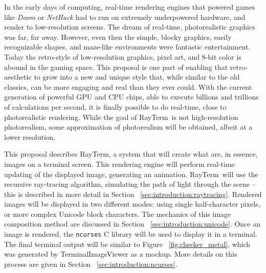 \documentclass[11pt]{article}
\newcommand{\name}{{\sc RayTerm}}
\begin{document}

In the early days of computing, real-time rendering engines that powered games like {\it Doom} or {\it NetHack} had to run on extremely underpowered hardware, and render to low-resolution screens.
The dream of real-time, photorealistic graphics was far, far away.
However, even then the simple, blocky graphics, easily recognizable shapes, and maze-like environments were fantastic entertainment.
Today the retro-style of low-resolution graphics, pixel art, and 8-bit color is abound in the gaming space.
This proposal is one part of enabling that retro-aesthetic to grow into a new and unique style that, while similar to the old classics, can be more engaging and real than they ever could.
With the current generation of powerful GPU and CPU chips, able to execute billions and trillions of calculations per second, it is finally possible to do real-time, close to photorealistic rendering.
While the goal of \name\ is not high-resolution photorealism, some approximation of photorealism will be obtained, albeit at a lower resolution.


This proposal describes \name, a system that will create what are, in essence, images on a terminal screen.
This rendering engine will perform real-time updating of the displayed image, generating an animation.
\name\ will use the recursive ray-tracing algorithm, simulating the path of light through the scene -- this is described in more detail in Section ~\ref{sec:introduction:raytracing}.
Rendered images will be displayed in two different modes: using single half-character pixels, or more complex Unicode block characters.
The mechanics of this image composition method are discussed in Section ~\ref{sec:introduction:unicode}.
Once an image is rendered, the \texttt{ncurses} C library \cite{ncursesLibrary} will be used to display it in a terminal.
The final terminal output will be similar to Figure ~\ref{fig:checker_metal}, which was generated by TerminalImageViewer \cite{tivGithub} as a mockup.
More details on this process are given in Section ~\ref{sec:introduction:ncurses}.
\end{document}
